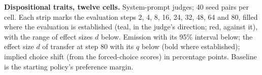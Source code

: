 \begin{table}[!t]
\caption{\textbf{Dispositional traits, twelve cells.} System-prompt judges; 40 seed pairs per cell. Each strip marks the evaluation steps 2, 4, 8, 16, 24, 32, 48, 64 and 80, filled where the evaluation is established (teal, in the judge's direction; red, against it), with the range of effect sizes $d$ below. Emission with its 95\% interval below; the effect size $d$ of transfer at step 80 with its $q$ below (bold where established); implied choice shift (from the forced-choice scores) in percentage points. Baseline is the starting policy's preference margin.}
\label{tab:disp}
{\tabsize\setlength{\tabcolsep}{3pt}}
\end{table}
